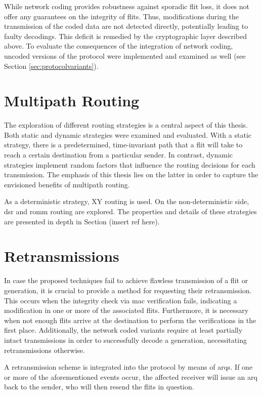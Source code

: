 While network coding provides robustness against sporadic flit loss, it does not offer any guarantees on the integrity of flits. Thus, modifications
during the transmission of the coded data are not detected directly, potentially leading to faulty decodings. This deficit is remedied by the cryptographic
layer described above. To evaluate the consequences of the integration of network coding, uncoded versions of the protocol were implemented and
examined as well (see Section \ref{sec:protocolvariants}).

\section{Multipath Routing}
The exploration of different routing strategies is a central aspect of this thesis. Both static and dynamic strategies were
examined and evaluated. With a static strategy, there is a predetermined, time-invariant path that a flit will take to reach a certain destination
from a particular sender. In contrast, dynamic strategies implement random factors that influence the routing decisions for each
transmission. The emphasis of this thesis lies on the latter in order to capture the envisioned benefits of multipath routing.

As a deterministic strategy, XY routing is used. On the non-deterministic side, \gls{dsr} and \gls{romm} routing are explored. The properties and
details of these strategies are presented in depth in Section (insert ref here).

\section{Retransmissions}\label{sec:retransmissions}
In case the proposed techniques fail to achieve flawless transmission of a flit or generation, it is crucial to provide a method for requesting
their retransmission. This occurs when the integrity check via \gls{mac} verification fails, indicating a modification in one or more of the
associated flits. Furthermore, it is necessary when not enough flits arrive at the destination to perform the verifications in the first place.
Additionally, the network coded variants require at least partially intact transmissions in order to successfully decode a generation, necessitating
retransmissions otherwise.

A retransmission scheme is integrated into the protocol by means of \glspl{arq}. If one or more of the aforementioned events occur, the affected
receiver will issue an \gls{arq} back to the sender, who will then resend the flits in question.

